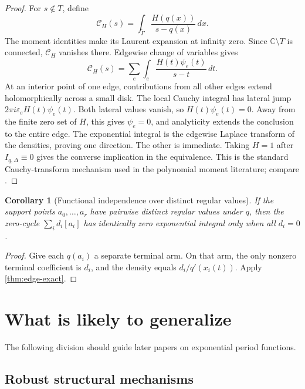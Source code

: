 \documentclass[11pt]{article}
\numberwithin{equation}{section}
\newtheorem{corollary}[theorem]{Corollary}
\theoremstyle{definition}
\theoremstyle{remark}
\newcommand{\C}{\mathbb C}
\begin{document}
\begin{proof}
For $s\notin T$, define
\[
  \mathcal C_H(s)=
  \int_{\widetilde\Gamma}\frac{H(q(x))}{s-q(x)}\,dx.
\]
The moment identities make its Laurent expansion at infinity zero.  Since
$\C\setminus T$ is connected, $\mathcal C_H$ vanishes there.  Edgewise
change of variables gives
\[
  \mathcal C_H(s)=
  \sum_e\int_e\frac{H(t)\psi_e(t)}{s-t}\,dt.
\]
At an interior point of one edge, contributions from all other edges extend
holomorphically across a small disk.  The local Cauchy integral has lateral
jump
$2\pi i\varepsilon_e H(t)\psi_e(t)$.  Both lateral values vanish, so
$H(t)\psi_e(t)=0$.  Away from the finite zero set of $H$, this gives
$\psi_e=0$, and analyticity extends the conclusion to the entire edge.
The exponential integral is the edgewise Laplace transform of the densities,
proving one direction.  The other is immediate.  Taking $H=1$ after
$I_{q,\Delta}\equiv0$ gives the converse implication in the equivalence.
This is the standard Cauchy-transform mechanism used in the polynomial
moment literature; compare \cite{GavrilovPakovich,PakovichRoytvarfYomdin}.
\end{proof}

\begin{corollary}[Functional independence over distinct regular values]
If the support points $a_0,\ldots,a_r$ have pairwise distinct regular
values under $q$, then the zero-cycle
$\sum_i d_i[a_i]$ has identically zero exponential integral only when all
$d_i=0$.
\end{corollary}

\begin{proof}
Give each $q(a_i)$ a separate terminal arm.  On that arm, the only nonzero
terminal coefficient is $d_i$, and the density equals
$d_i/q'(x_i(t))$.  Apply \cref{thm:edge-exact}.
\end{proof}

\section{What is likely to generalize}

The following division should guide later papers on exponential
period functions.

\subsection{Robust structural mechanisms}
\end{document}
